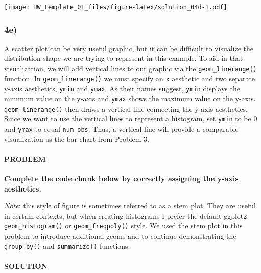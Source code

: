 \documentclass[]{article}
\newenvironment{Shaded}{\begin{snugshade}}{\end{snugshade}}
\newcommand{\DataTypeTok}[1]{\textcolor[rgb]{0.13,0.29,0.53}{#1}}
\newcommand{\DecValTok}[1]{\textcolor[rgb]{0.00,0.00,0.81}{#1}}
\newcommand{\KeywordTok}[1]{\textcolor[rgb]{0.13,0.29,0.53}{\textbf{#1}}}
\newcommand{\NormalTok}[1]{#1}
\newcommand{\OperatorTok}[1]{\textcolor[rgb]{0.81,0.36,0.00}{\textbf{#1}}}
\newcommand{\StringTok}[1]{\textcolor[rgb]{0.31,0.60,0.02}{#1}}
\let\oldparagraph\paragraph
\renewcommand{\paragraph}[1]{\oldparagraph{#1}\mbox{}}
\begin{document}
\texttt{[image: HW\_template\_01\_files/figure-latex/solution\_04d-1.pdf]}

\hypertarget{e-3}{%
\subsubsection{4e)}\label{e-3}}

A scatter plot can be very useful graphic, but it can be difficult to
visualize the distribution shape we are trying to represent in this
example. To aid in that visualization, we will add vertical lines to our
graphic via the \texttt{geom\_linerange()} function. In
\texttt{geom\_linerange()} we must specify an \texttt{x} aesthetic and
two separate y-axis aesthetics, \texttt{ymin} and \texttt{ymax}. As
their names suggest, \texttt{ymin} displays the minimum value on the
y-axis and \texttt{ymax} shows the maximum value on the y-axis.
\texttt{geom\_linerange()} then draws a vertical line connecting the
y-axis aesthetics. Since we want to use the vertical lines to represent
a histogram, set \texttt{ymin} to be 0 and \texttt{ymax} to equal
\texttt{num\_obs}. Thus, a vertical line will provide a comparable
visualization as the bar chart from Problem 3.

\hypertarget{problem-22}{%
\paragraph{PROBLEM}\label{problem-22}}

\textbf{Complete the code chunk below by correctly assigning the y-axis
aesthetics.}

\emph{Note}: this style of figure is sometimes referred to as a stem
plot. They are useful in certain contexts, but when creating histograms
I prefer the default ggplot2 \texttt{geom\_histogram()} or
\texttt{geom\_freqpoly()} style. We used the stem plot in this problem
to introduce additional geoms and to continue demonstrating the
\texttt{group\_by()} and \texttt{summarize()} functions.

\hypertarget{solution-21}{%
\paragraph{SOLUTION}\label{solution-21}}

\begin{Shaded}
\end{Shaded}
\end{document}
